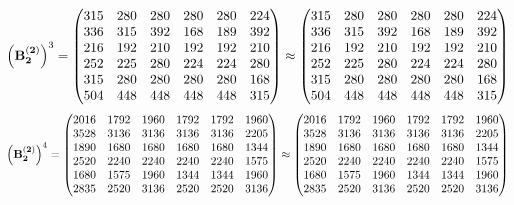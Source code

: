 \documentclass[10pt,a4paper]{article}
\begin{document}
	\[
		\left(\bold{B_2^{(2)}}\right)^{3} = 
		\begin{pmatrix}
			{{315}}{} & {{280}}{} & {{280}}{} & {{280}}{} & {{280}}{} & {{224}}{} \\
			{{336}}{} & {{315}}{} & {{392}}{} & {{168}}{} & {{189}}{} & {{392}}{} \\
			{{216}}{} & {{192}}{} & {{210}}{} & {{192}}{} & {{192}}{} & {{210}}{} \\
			{{252}}{} & {{225}}{} & {{280}}{} & {{224}}{} & {{224}}{} & {{280}}{} \\
			{{315}}{} & {{280}}{} & {{280}}{} & {{280}}{} & {{280}}{} & {{168}}{} \\
			{{504}}{} & {{448}}{} & {{448}}{} & {{448}}{} & {{448}}{} & {{315}}{} \\
		\end{pmatrix}
		\approx
		\begin{pmatrix}
			315      & 280      & 280      & 280      & 280      & 224      \\
			336      & 315      & 392      & 168      & 189      & 392      \\
			216      & 192      & 210      & 192      & 192      & 210      \\
			252      & 225      & 280      & 224      & 224      & 280      \\
			315      & 280      & 280      & 280      & 280      & 168      \\
			504      & 448      & 448      & 448      & 448      & 315      \\
		\end{pmatrix}
	\]
	\[
		\left(\bold{B_2^{(2)}}\right)^{4} = 
		\begin{pmatrix}
			{{2016}}{} & {{1792}}{} & {{1960}}{} & {{1792}}{} & {{1792}}{} & {{1960}}{} \\
			{{3528}}{} & {{3136}}{} & {{3136}}{} & {{3136}}{} & {{3136}}{} & {{2205}}{} \\
			{{1890}}{} & {{1680}}{} & {{1680}}{} & {{1680}}{} & {{1680}}{} & {{1344}}{} \\
			{{2520}}{} & {{2240}}{} & {{2240}}{} & {{2240}}{} & {{2240}}{} & {{1575}}{} \\
			{{1680}}{} & {{1575}}{} & {{1960}}{} & {{1344}}{} & {{1344}}{} & {{1960}}{} \\
			{{2835}}{} & {{2520}}{} & {{3136}}{} & {{2520}}{} & {{2520}}{} & {{3136}}{} \\
		\end{pmatrix}
		\approx
		\begin{pmatrix}
			2016     & 1792     & 1960     & 1792     & 1792     & 1960     \\
			3528     & 3136     & 3136     & 3136     & 3136     & 2205     \\
			1890     & 1680     & 1680     & 1680     & 1680     & 1344     \\
			2520     & 2240     & 2240     & 2240     & 2240     & 1575     \\
			1680     & 1575     & 1960     & 1344     & 1344     & 1960     \\
			2835     & 2520     & 3136     & 2520     & 2520     & 3136     \\
		\end{pmatrix}
	\]
\end{document}

